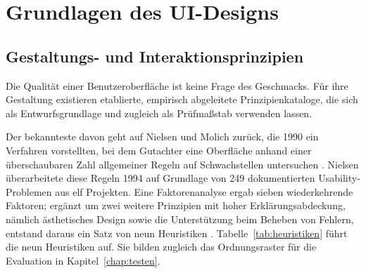 \section{Grundlagen des UI-Designs}
\label{sec:ui-design}
\subsection{Gestaltungs- und Interaktionsprinzipien}
\label{subsec:gestaltungsprinzipien}
 
Die Qualität einer Benutzeroberfläche ist keine Frage des
Geschmacks. Für ihre Gestaltung existieren etablierte, empirisch
abgeleitete Prinzipienkataloge, die sich als Entwurfsgrundlage und
zugleich als Prüfmaßstab verwenden lassen.
 
Der bekannteste davon geht auf Nielsen und Molich zurück, die 1990
ein Verfahren vorstellten, bei dem Gutachter eine Oberfläche anhand
einer überschaubaren Zahl allgemeiner Regeln auf Schwachstellen
untersuchen \cite{nielsen_molich_heuristic}. Nielsen überarbeitete diese Regeln 1994 auf Grundlage von 249
dokumentierten Usability-Problemen aus elf Projekten. Eine Faktorenanalyse ergab sieben wiederkehrende Faktoren; ergänzt um
zwei weitere Prinzipien mit hoher Erklärungsabdeckung, nämlich
ästhetisches Design sowie die Unterstützung beim Beheben von Fehlern,
entstand daraus ein Satz von neun Heuristiken
\cite{nielsen_explanatory_power}. Tabelle~\ref{tab:heuristiken} führt die neun Heuristiken auf. Sie
bilden zugleich das Ordnungsraster für die Evaluation in
Kapitel~\ref{chap:testen}.

